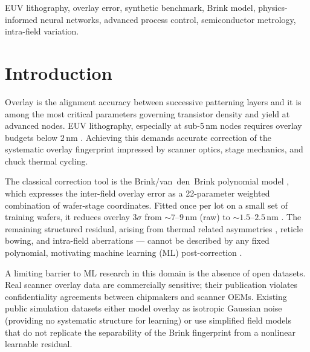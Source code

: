 \documentclass[10pt,conference]{IEEEtran}
\begin{document}
\begin{IEEEkeywords}
EUV lithography, overlay error, synthetic benchmark, Brink model,
physics-informed neural networks, advanced process control, semiconductor
metrology, intra-field variation.
\end{IEEEkeywords}

\section{Introduction}

Overlay is the alignment accuracy between successive patterning layers and it
is among the most critical parameters governing transistor density and yield
at advanced nodes.  EUV lithography, especially at sub-5\,nm nodes requires overlay budgets
below $2$\,nm \cite{levinson2022, vanschoot2019}.  Achieving this demands
accurate correction of the systematic overlay fingerprint impressed by scanner
optics, stage mechanics, and chuck thermal cycling.

The classical correction tool is the Brink/van~den~Brink polynomial model
\cite{brink1994, vandenBrink1996}, which expresses the inter-field overlay
error as a 22-parameter weighted combination of wafer-stage coordinates.
Fitted once per lot on a small set of training wafers, it reduces overlay
$3\sigma$ from $\sim\!7$–$9$\,nm (raw) to $\sim\!1.5$–$2.5$\,nm
\cite{phillips2020}.  The remaining structured residual, arising from
thermal related asymmetries \cite{houlihan2007}, reticle bowing, and intra-field
aberrations \cite{magklaras2025, bornwolf1999} — cannot be described by any
fixed polynomial, motivating machine learning (ML) post-correction
\cite{smith2018, abbe2019, kim2020, raissi2019}.

A limiting barrier to ML research in this domain is the absence of open
datasets.  Real scanner overlay data are commercially sensitive; their
publication violates confidentiality agreements between chipmakers and scanner
OEMs.  Existing public simulation datasets either model overlay as isotropic
Gaussian noise (providing no systematic structure for learning) or use
simplified field models that do not replicate the separability of the Brink
fingerprint from a nonlinear learnable residual.
\end{document}

